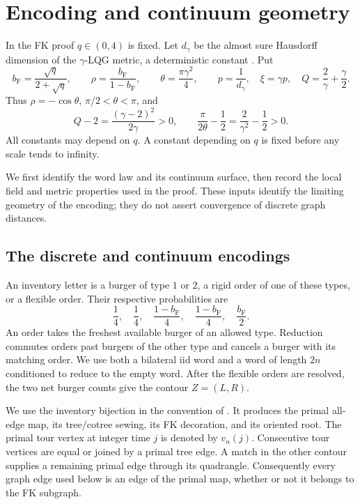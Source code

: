 \section{Encoding and continuum geometry}\label{sec:framework}

In the FK proof \(q\in(0,4)\) is fixed. Let \(d_\gamma\) be the
almost sure Hausdorff dimension of the \(\gamma\)-LQG metric,
a deterministic constant \cite[Corollary~1.7]{GwynnePfefferKPZ}. Put
\begin{equation}\label{bg:parameters}
 b_{\mathrm F}=\frac{\sqrt q}{2+\sqrt q},\qquad
 \rho=\frac{b_{\mathrm F}}{1-b_{\mathrm F}},\qquad
 \theta=\frac{\pi\gamma^2}{4},\qquad
 p=\frac1{d_\gamma},\quad \xi=\gamma p,\quad
 Q=\frac2\gamma+\frac\gamma2 .
\end{equation}
Thus \(\rho=-\cos\theta\), \(\pi/2<\theta<\pi\), and
\begin{equation}\label{bg:strict-margins}
 Q-2=\frac{(\gamma-2)^2}{2\gamma}>0,\qquad
 \frac{\pi}{2\theta}-\frac12=\frac2{\gamma^2}-\frac12>0.
\end{equation}
All constants may depend on \(q\). A constant depending on \(q\) is fixed before any scale tends to infinity.

We first identify the word law and its continuum surface, then record the
local field and metric properties used in the proof. These inputs identify
the limiting geometry of the encoding; they do not assert convergence of
discrete graph distances.

\subsection{The discrete and continuum encodings}

An inventory letter is a burger of type \(1\) or \(2\), a rigid order of one of these types, or a flexible order. Their respective probabilities are
\[
 \frac14,\quad\frac14,\quad
 \frac{1-b_{\mathrm F}}4,\quad\frac{1-b_{\mathrm F}}4,
 \quad\frac{b_{\mathrm F}}2.
\]
An order takes the freshest available burger of an allowed type. Reduction commutes orders past burgers of the other type and cancels a burger with its matching order. We use both a bilateral iid word and a word of length \(2n\) conditioned to reduce to the empty word. After the flexible orders are resolved, the two net burger counts give the contour \(Z=(L,R)\).

We use the inventory bijection in the convention of \cite{SheffieldInventory}. It produces the primal all-edge map, its tree/cotree sewing, its FK decoration, and its oriented root. The primal tour vertex at integer time \(j\) is denoted by \(v_n(j)\). Consecutive tour vertices are equal or joined by a primal tree edge. A match in the other contour supplies a remaining primal edge through its quadrangle. Consequently every graph edge used below is an edge of the primal map, whether or not it belongs to the FK subgraph.

